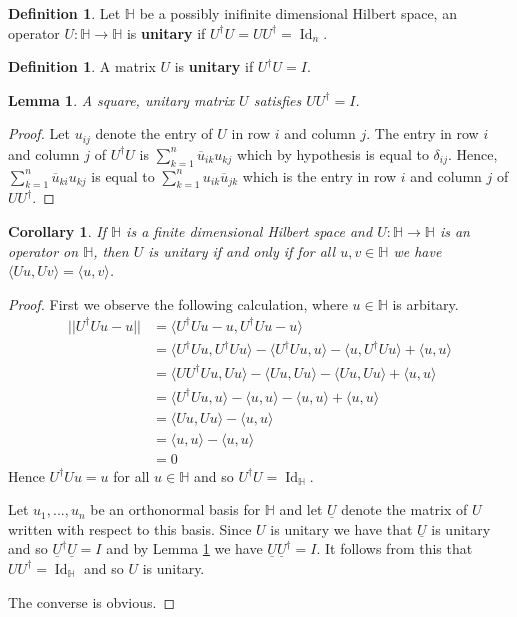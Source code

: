 \documentclass[12pt]{article}
\theoremstyle{plain}
\newtheorem{lemma}[thm]{Lemma}
\newtheorem{cor}[thm]{Corollary}
\theoremstyle{definition}
\newtheorem{defn}[thm]{Definition} %
\newcommand{\bb}[1]{\mathbb{#1}}
\newcommand{\lto}{\longrightarrow}
\begin{document}
\begin{defn}
	Let $\bb{H}$ be a possibly inifinite dimensional Hilbert space, an operator $U: \bb{H} \lto \bb{H}$ is \textbf{unitary} if $U^\dagger U = U U^\dagger = \operatorname{Id}_n$.
\end{defn}
\begin{defn}
	A matrix $U$ is \textbf{unitary} if $U^\dagger U = I$. 
\end{defn}
\begin{lemma}\label{lem:unitary_red}
	A square, unitary matrix $U$ satisfies $UU^\dagger = I$.
\end{lemma}
\begin{proof}
Let $u_{ij}$ denote the entry of $U$ in row $i$ and column $j$. The entry in row $i$ and column $j$ of $U^\dagger U$ is $\sum_{k = 1}^n \overline{u}_{ik}u_{kj}$ which by hypothesis is equal to $\delta_{ij}$. Hence, $\sum_{k = 1}^n \overline{u}_{ki}u_{kj}$ is equal to $\sum_{k = 1}^n u_{ik}\overline{u}_{jk}$ which is the entry in row $i$ and column $j$ of $UU^\dagger$.
\end{proof}
\begin{cor}\label{cor:unitary_simple}
	If $\bb{H}$ is a finite dimensional Hilbert space and $U: \bb{H} \lto \bb{H}$ is an operator on $\bb{H}$, then $U$ is unitary if and only if for all $u, v \in \bb{H}$ we have $\langle Uu, Uv \rangle = \langle u, v \rangle$.
\end{cor}
\begin{proof}
	First we observe the following calculation, where $u \in \bb{H}$ is arbitary.
\begin{align*}
	||U^\dagger U u - u|| &= \langle U^\dagger U u - u, U^\dagger U u - u \rangle\\
	&= \langle U^\dagger U u, U^\dagger U u \rangle - \langle U^\dagger U u, u \rangle - \langle u, U^\dagger U u \rangle + \langle u, u \rangle\\
	&= \langle U U^\dagger U u, U u \rangle - \langle Uu, Uu \rangle - \langle U u, U u \rangle + \langle u ,u \rangle\\
	&= \langle U^\dagger U u, u \rangle - \langle u, u \rangle - \langle u, u \rangle + \langle u, u \rangle\\
	&= \langle Uu, Uu \rangle - \langle u, u \rangle\\
	&= \langle u, u \rangle - \langle u, u \rangle\\
	&= 0
\end{align*}
Hence $U^\dagger U u = u$ for all $u \in \bb{H}$ and so $U^\dagger U = \operatorname{Id}_{\bb{H}}$.

Let $u_1,...,u_n$ be an orthonormal basis for $\bb{H}$ and let $\underline{U}$ denote the matrix of $U$ written with respect to this basis. Since $U$ is unitary we have that $\underline{U}$ is unitary and so $\underline{U}^\dagger \underline{U} = I$ and by Lemma \ref{lem:unitary_red} we have $\underline{U}\underline{U}^\dagger = I$. It follows from this that $UU^\dagger = \operatorname{Id}_{\bb{H}}$ and so $U$ is unitary.

The converse is obvious.
\end{proof}
\end{document}
